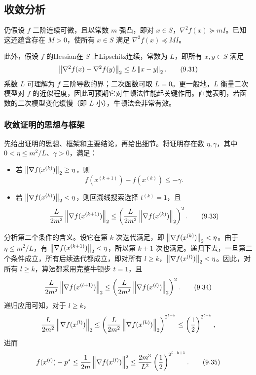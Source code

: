 \subsection{收敛分析}
仍假设 $f$ 二阶连续可微，且以常数 $m$ 强凸，即对 $x\in S$，$\nabla^2f(x)\succeq mI$。已知这还蕴含存在 $M>0$，使所有 $x\in S$ 满足 $\nabla^2f(x)\preceq MI$。

此外，假设 $f$ 的Hessian在 $S$ 上Lipschitz连续，常数为 $L$，即所有 $x,y\in S$ 满足
\begin{equation}
\left\lVert \nabla^2f(x)-\nabla^2f(y)\right\rVert_2\le L\left\lVert x-y\right\rVert_2.\tag{9.31}
\end{equation}
系数 $L$ 可理解为 $f$ 三阶导数的界；二次函数可取 $L=0$。更一般地，$L$ 衡量二次模型对 $f$ 的近似程度，因此可预期它对牛顿法性能起关键作用。直觉表明，若函数的二次模型变化缓慢（即 $L$ 小），牛顿法会非常有效。

\subsubsection*{收敛证明的思想与框架}
先给出证明的思想、框架和主要结论，再给出细节。将证明存在数 $\eta,\gamma$，其中 $0<\eta\le m^2/L$、$\gamma>0$，满足：
\begin{itemize}
\item 若 $\left\lVert \nabla f(x^{(k)})\right\rVert_2\ge\eta$，则
\begin{equation}
f(x^{(k+1)})-f(x^{(k)})\le-\gamma.\tag{9.32}
\end{equation}
\item 若 $\left\lVert \nabla f(x^{(k)})\right\rVert_2<\eta$，则回溯线搜索选择 $t^{(k)}=1$，且
\begin{equation}
\frac L{2m^2}\left\lVert \nabla f(x^{(k+1)})\right\rVert_2
\le\left(\frac L{2m^2}\left\lVert \nabla f(x^{(k)})\right\rVert_2\right)^2.\tag{9.33}
\end{equation}
\end{itemize}
分析第二个条件的含义。设它在第 $k$ 次迭代满足，即 $\left\lVert \nabla f(x^{(k)})\right\rVert_2<\eta$。由于 $\eta\le m^2/L$，有 $\left\lVert \nabla f(x^{(k+1)})\right\rVert_2<\eta$，所以第 $k+1$ 次也满足。递归下去，一旦第二个条件成立，所有后续迭代都成立，即对所有 $l\ge k$，$\left\lVert \nabla f(x^{(l)})\right\rVert_2<\eta$。因此，对所有 $l\ge k$，算法都采用完整牛顿步 $t=1$，且
\begin{equation}
\frac L{2m^2}\left\lVert \nabla f(x^{(l+1)})\right\rVert_2
\le\left(\frac L{2m^2}\left\lVert \nabla f(x^{(l)})\right\rVert_2\right)^2.\tag{9.34}
\end{equation}
递归应用可知，对于 $l\ge k$，
\[
\frac L{2m^2}\left\lVert \nabla f(x^{(l)})\right\rVert_2
\le\left(\frac L{2m^2}\left\lVert \nabla f(x^{(k)})\right\rVert_2\right)^{2^{l-k}}
\le\left(\frac12\right)^{2^{l-k}},
\]
进而
\begin{equation}
f(x^{(l)})-p^\star\le\frac1{2m}\left\lVert \nabla f(x^{(l)})\right\rVert_2^2
\le\frac{2m^3}{L^2}\left(\frac12\right)^{2^{l-k+1}}.\tag{9.35}
\end{equation}

